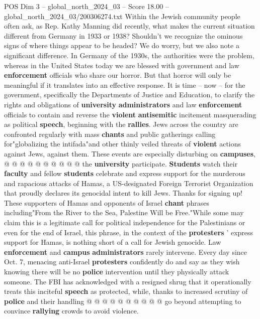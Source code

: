 \begin{textsample}{POS Dim 3 – global\_north\_2024\_03 – Score 18.00 – global\_north\_2024\_03/200306274.txt}  \label{ex:f3_pos_268}
Within the Jewish community people often ask, as Rep.
Kathy Manning did recently, what makes the current situation different from Germany in 1933 or 1938?
Shouldn't we recognize the ominous signs of where things appear to be headed?
We do worry, but we also note a significant difference.
In Germany of the 1930s, the authorities were the problem, whereas in the United States today we are blessed with government and law \textbf{enforcement} officials who share our horror.
But that horror will only be meaningful if it translates into an effective response.
It is time -- now -- for the government, specifically the Departments of Justice and Education, to clarify the rights and obligations of \textbf{university} \textbf{administrators} and law \textbf{enforcement} officials to contain and reverse the \textbf{violent} \textbf{antisemitic} incitement masquerading as political \textbf{speech}, beginning with the \textbf{rallies}.
Jews across the country are confronted regularly with mass \textbf{chants} and public gatherings calling for"globalizing the intifada"and other thinly veiled threats of \textbf{violent} actions against Jews, against them.
These events are especially disturbing on \textbf{campuses}, @ @ @ @ @ @ @ @ @ @ the \textbf{university} participate. \textbf{Students} watch their \textbf{faculty} and fellow \textbf{students} celebrate and express support for the murderous and rapacious attacks of Hamas, a US-designated Foreign Terrorist Organization that proudly declares its genocidal intent to kill Jews.
Thanks for signing up!
These supporters of Hamas and opponents of Israel \textbf{chant} phrases including"From the River to the Sea, Palestine Will be Free."While some may claim this is a legitimate call for political independence for the Palestinians or even for the end of Israel, this phrase, in the context of the \textbf{protesters} ' express support for Hamas, is nothing short of a call for Jewish genocide.
Law \textbf{enforcement} and \textbf{campus} \textbf{administrators} rarely intervene.
Every day since Oct. 7, menacing anti-Israel \textbf{protesters} confidently do and say as they wish knowing there will be no \textbf{police} intervention until they physically attack someone.
The FBI has acknowledged with a resigned shrug that it operationally treats this inciteful \textbf{speech} as protected, while, thanks to increased scrutiny of \textbf{police} and their handling @ @ @ @ @ @ @ @ @ @ go beyond attempting to convince \textbf{rallying} crowds to avoid violence.

\end{textsample}
